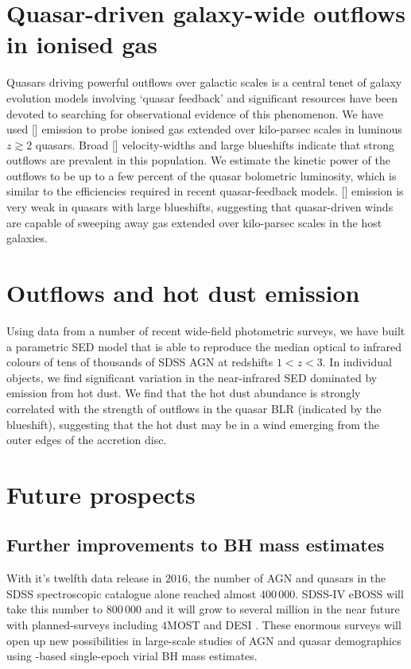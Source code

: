 \section{Quasar-driven galaxy-wide outflows in ionised gas} 

Quasars driving powerful outflows over galactic scales is a central tenet of galaxy evolution models involving `quasar feedback' and significant resources have been devoted to searching for observational evidence of this phenomenon.  
We have used [] emission to probe ionised gas extended over kilo-parsec scales in luminous $z\gtrsim2$ quasars.
Broad [] velocity-widths and large blueshifts indicate that strong outflows are prevalent in this population.  
We estimate the kinetic power of the outflows to be up to a few percent of the quasar bolometric luminosity, which is similar to the efficiencies required in recent quasar-feedback models. 
[] emission is very weak in quasars with large  blueshifts, suggesting that quasar-driven winds are capable of sweeping away gas extended over kilo-parsec scales in the host galaxies. 

\section{Outflows and hot dust emission}

Using data from a number of recent wide-field photometric surveys, we have built a parametric SED model that is able to reproduce the median optical to infrared colours of tens of thousands of SDSS AGN at redshifts $1 < z < 3$. 
In individual objects, we find significant variation in the near-infrared SED dominated by emission from hot dust. 
We find that the hot dust abundance is strongly correlated with the strength of outflows in the quasar BLR (indicated by the  blueshift), suggesting that the hot dust may be in a wind emerging from the outer edges of the accretion disc. 

\section{Future prospects}

\subsection{Further improvements to BH mass estimates}

With it's twelfth data release in $2016$, the number of AGN and quasars in the SDSS spectroscopic catalogue alone reached almost $400\,000$. 
SDSS-IV eBOSS will take this number to $800\,000$ \citep{myers15} and it will grow to several million in the near future with planned-surveys including $4$MOST and DESI \citep{dejong12,levi13}.
These enormous surveys will open up new possibilities in large-scale studies of AGN and quasar demographics using -based single-epoch virial BH mass estimates.

